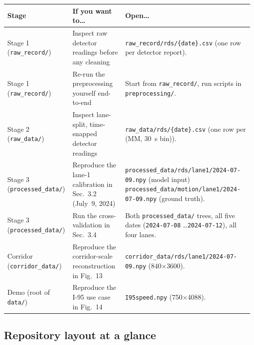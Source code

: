 \documentclass[11pt]{article}
\newcommand{\code}[1]{\texttt{#1}}
\newcommand{\filename}[1]{\textcolor{accent}{\code{#1}}}
\begin{document}
\begin{tabularx}{\textwidth}{L{3.2cm} L{4.4cm} X}
\toprule
\textbf{Stage} & \textbf{If you want to\dots} & \textbf{Open\dots} \\
\midrule
Stage 1 \newline (\code{raw\_record/})
  & Inspect raw detector readings before any cleaning
  & \filename{raw\_record/rds/\{date\}.csv} (one row per detector report). \\
\addlinespace
Stage 1 \newline (\code{raw\_record/})
  & Re-run the preprocessing yourself end-to-end
  & Start from \filename{raw\_record/}, run scripts in \code{preprocessing/}. \\
\addlinespace
Stage 2 \newline (\code{raw\_data/})
  & Inspect lane-split, time-snapped detector readings
  & \filename{raw\_data/rds/\{date\}.csv} (one row per (MM, 30~s bin)). \\
\addlinespace
Stage 3 \newline (\code{processed\_data/})
  & Reproduce the lane-1 calibration in Sec.~3.2 (July~9, 2024)
  & \filename{processed\_data/rds/lane1/2024-07-09.npy} \newline (model input) \newline
    \filename{processed\_data/motion/lane1/2024-07-09.npy} \newline (ground truth). \\
\addlinespace
Stage 3 \newline (\code{processed\_data/})
  & Run the cross-validation in Sec.~3.4
  & Both \code{processed\_data/} trees, all five dates
    (\code{2024-07-08} \dots \code{2024-07-12}), all four lanes. \\
\addlinespace
Corridor \newline (\code{corridor\_data/})
  & Reproduce the corridor-scale reconstruction in Fig.~13
  & \filename{corridor\_data/rds/lane1/2024-07-09.npy} \newline (840$\times$3600). \\
\addlinespace
Demo \newline (root of \code{data/})
  & Reproduce the I-95 use case in Fig.~14
  & \filename{I95speed.npy} (750$\times$4088). \\
\bottomrule
\end{tabularx}

\subsection*{Repository layout at a glance}
\end{document}

